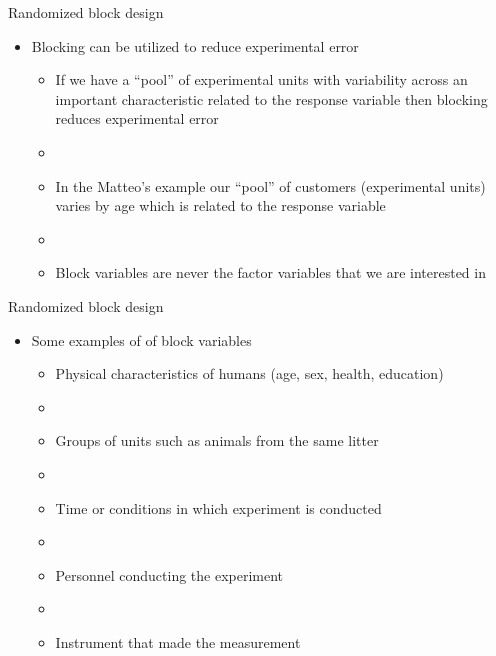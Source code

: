 \documentclass[xcolor=dvipsnames]{beamer}
\begin{document}
\begin{frame}{Randomized block design}
	\begin{itemize}
		\item Blocking can be utilized to reduce experimental error  \pause
		\begin{itemize}
	\item If we have a ``pool'' of experimental units with variability across an important characteristic related to the response variable then blocking reduces experimental error  \pause
	\item[]
	\item In the Matteo's example our ``pool'' of customers (experimental units) varies by age which is related to the response variable \pause
	\item[]
	\item Block variables are never the factor variables that we are interested in
\end{itemize}
	\end{itemize}
\end{frame}

\begin{frame}{Randomized block design}
	\begin{itemize}
		\item Some examples of of block variables \pause
		\begin{itemize}
			\item Physical characteristics of humans (age, sex, health, education) \pause
			\item[]
			\item Groups of units such as animals from the same litter \pause
			\item[]
			\item Time or conditions in which experiment is conducted \pause
			\item[] 
			\item Personnel conducting the experiment \pause
			\item[]
			\item Instrument that made the measurement 
		\end{itemize}
	\end{itemize}
\end{frame}
\end{document}
